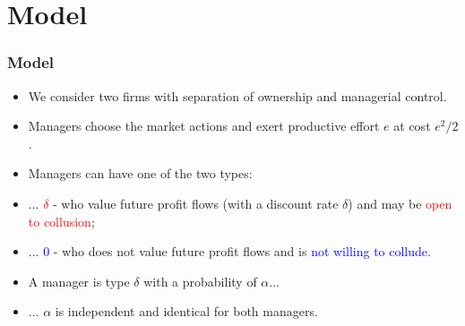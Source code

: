 \documentclass[xcolor=dvipsnames]{beamer}
\begin{document}
\section{Model}

\begin{frame}
\frametitle{Model}
	\begin{itemize}
		\item We consider two firms with separation of ownership and managerial control.
		
		\item Managers choose the market actions and exert productive effort $e$ at cost $e^2/2$.
		
		\item Managers can have one of the two types:
		
		\item[] ... \textcolor{red}{$\delta$} - who value future profit flows (with a discount rate $\delta$) and may be \textcolor{red}{open to collusion};
				
		\item[] ... \textcolor{blue}{$0$} - who does not value future profit flows and is \textcolor{blue}{not willing to collude}.		
		
		\item A manager is type $\delta$ with a probability of $\alpha$...
		
		\item[] ... $\alpha$ is independent and identical for both managers.
		\end{itemize}
\end{frame}
\end{document}
